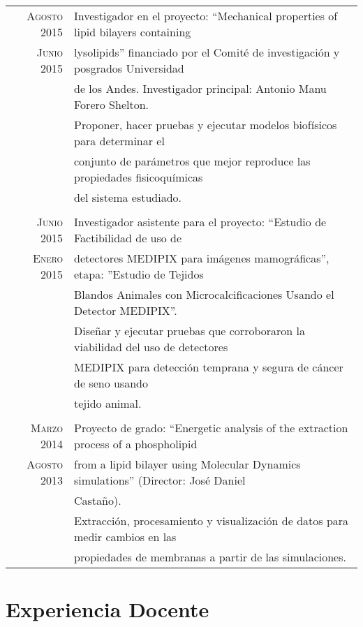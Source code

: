 \documentclass[a4paper,10pt]{article} %
\begin{document}
\begin{tabular}{rl}

\textsc{Agosto 2015} & Investigador en el proyecto: ``Mechanical properties of lipid bilayers containing \\ 
\textsc{Junio 2015}   & lysolipids'' financiado por el Comité de investigación y posgrados Universidad \\ 
& de los Andes. Investigador principal: Antonio Manu Forero Shelton.  \\
& Proponer, hacer pruebas y ejecutar modelos biofísicos para determinar el \\ & conjunto de parámetros que mejor reproduce las propiedades fisicoquímicas \\& del sistema estudiado. \\
\\ 
\textsc{Junio 2015} & Investigador asistente para el proyecto: ``Estudio de Factibilidad de uso de \\ 
\textsc{Enero 2015} & detectores MEDIPIX para imágenes mamográficas'', etapa: ''Estudio de Tejidos  
\\& Blandos Animales con Microcalciﬁcaciones Usando el Detector MEDIPIX''. \\
& Diseñar y ejecutar pruebas que corroboraron la viabilidad del uso de detectores  \\& MEDIPIX para detección temprana y segura de cáncer de seno usando \\& tejido animal. \\
\\
\textsc{Marzo 2014} & Proyecto de grado: ``Energetic analysis of the  extraction process of a phospholipid\\
\textsc{Agosto 2013} & from a lipid bilayer using Molecular Dynamics simulations'' (Director: Jos\'e Daniel \\ & Casta\~no). \\
& Extracción, procesamiento y visualización de datos para medir cambios en las \\ & propiedades de membranas a partir de las simulaciones.

\end{tabular}



\color{OrangeRed}
\section{Experiencia Docente}
\color{black}
\end{document}
